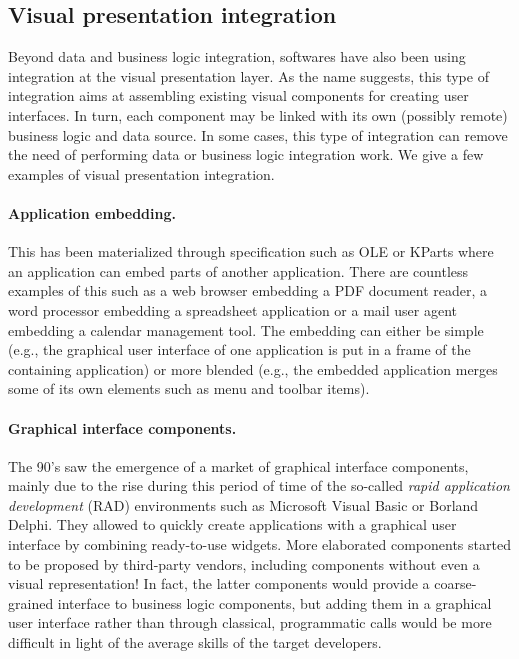 
\subsection{Visual presentation integration}


Beyond data and business logic integration, softwares have also been using integration at the visual presentation layer. As the name suggests, this type of integration aims at assembling existing visual components for creating user interfaces. In turn, each component may be linked with its own (possibly remote) business logic and data source. In some cases, this type of integration can remove the need of performing data or business logic integration work. We give a few examples of visual presentation integration.\\

\paragraph{Application embedding.}
This has been materialized through specification such as OLE or KParts where an application can embed parts of another application. There are countless examples of this such as a web browser embedding a PDF document reader, a word processor embedding a spreadsheet application or a mail user agent embedding a calendar management tool. The embedding can either be simple (e.g., the graphical user interface of one application is put in a frame of the containing application) or more blended (e.g., the embedded application merges some of its own elements such as menu and toolbar items).\\

\paragraph{Graphical interface components.}
The 90's saw the emergence of a market of graphical interface components, mainly due to the rise during this period of time of the so-called \emph{rapid application development} (RAD) environments such as Microsoft Visual Basic or Borland Delphi. They allowed to quickly create applications with a graphical user interface by combining ready-to-use widgets. More elaborated components started to be proposed by third-party vendors, including components without even a visual representation! In fact, the latter components would provide a coarse-grained interface to business logic components, but adding them in a graphical user interface rather than through classical, programmatic calls would be more difficult in light of the average skills of the target developers.\\

